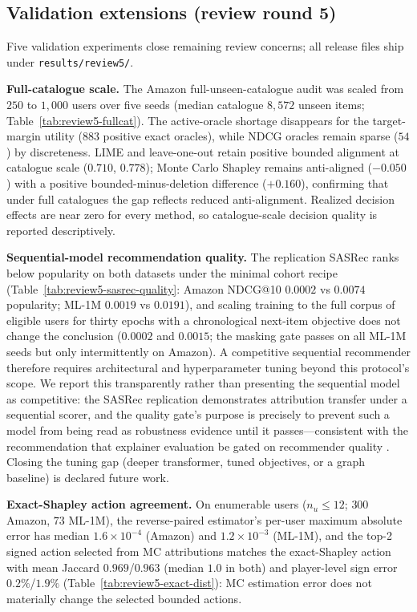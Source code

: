 \documentclass[pdflatex,sn-mathphys-num]{sn-jnl}
\theoremstyle{thmstyleone}
\theoremstyle{thmstyletwo}
\theoremstyle{thmstylethree}
\begin{document}
\subsection{Validation extensions (review round 5)}\label{app:review5}
Five validation experiments close remaining review concerns; all release files ship under \texttt{results/review5/}.

\textbf{Full-catalogue scale.} The Amazon full-unseen-catalogue audit was scaled from $250$ to $1{,}000$ users over five seeds (median catalogue $8{,}572$ unseen items; Table~\ref{tab:review5-fullcat}). The active-oracle shortage disappears for the target-margin utility ($883$ positive exact oracles), while NDCG oracles remain sparse ($54$) by discreteness. LIME and leave-one-out retain positive bounded alignment at catalogue scale ($0.710$, $0.778$); Monte Carlo Shapley remains anti-aligned ($-0.050$) with a positive bounded-minus-deletion difference ($+0.160$), confirming that under full catalogues the gap reflects reduced anti-alignment. Realized decision effects are near zero for every method, so catalogue-scale decision quality is reported descriptively.

\textbf{Sequential-model recommendation quality.} The replication SASRec ranks below popularity on both datasets under the minimal cohort recipe (Table~\ref{tab:review5-sasrec-quality}: Amazon NDCG@10 $0.0002$ vs $0.0074$ popularity; ML-1M $0.0019$ vs $0.0191$), and scaling training to the full corpus of eligible users for thirty epochs with a chronological next-item objective does not change the conclusion ($0.0002$ and $0.0015$; the masking gate passes on all ML-1M seeds but only intermittently on Amazon). A competitive sequential recommender therefore requires architectural and hyperparameter tuning beyond this protocol's scope. We report this transparently rather than presenting the sequential model as competitive: the SASRec replication demonstrates attribution transfer under a sequential scorer, and the quality gate's purpose is precisely to prevent such a model from being read as robustness evidence until it passes---consistent with the recommendation that explainer evaluation be gated on recommender quality \cite{mohammadi2024recsys}. Closing the tuning gap (deeper transformer, tuned objectives, or a graph baseline) is declared future work.

\textbf{Exact-Shapley action agreement.} On enumerable users ($n_u\le12$; $300$ Amazon, $73$ ML-1M), the reverse-paired estimator's per-user maximum absolute error has median $1.6\times10^{-4}$ (Amazon) and $1.2\times10^{-3}$ (ML-1M), and the top-2 signed action selected from MC attributions matches the exact-Shapley action with mean Jaccard $0.969$/$0.963$ (median $1.0$ in both) and player-level sign error $0.2\%$/$1.9\%$ (Table~\ref{tab:review5-exact-dist}): MC estimation error does not materially change the selected bounded actions.
\end{document}
